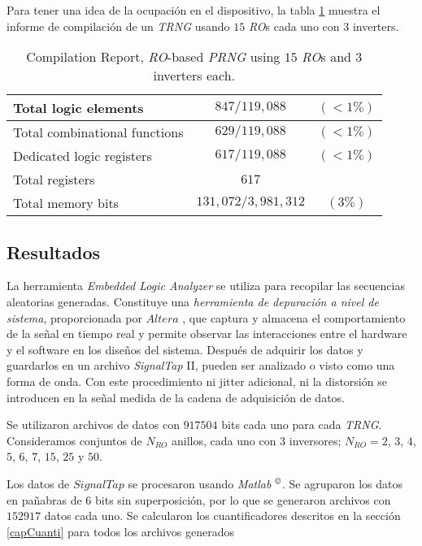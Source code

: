 Para tener una idea de la ocupación en el dispositivo, la tabla \ref{table:compilation} muestra el informe de compilación de un \emph{TRNG} usando $15$ \emph{RO}s cada uno con $3$ inverters.
\begin{table}
\begin{center}
\begin{tabular}{| l | c  c | }
	\hline
	\footnotesize{Total logic elements}          & $847/119,088$       & $( < 1 \%)$  \\ \hline
	\footnotesize{Total combinational functions} & $629/119,088$       & $( < 1 \%)$  \\ \hline
	\footnotesize{Dedicated logic registers}     & $617/119,088$       & $( < 1 \%)$  \\ \hline
	\footnotesize{Total registers}               & $617$               &  \\ \hline
	\footnotesize{Total memory bits}             & $131,072/3,981,312$ & $( 3 \%)$    \\ \hline
\end{tabular}
\end{center}
\caption{Compilation Report, \emph{RO}-based \emph{PRNG} using $15$ \emph{RO}s and $3$ inverters each.}
\label{table:compilation}
\end{table}

\subsection{Resultados}
\label{sec:results}

La herramienta \emph{Embedded Logic Analyzer} se utiliza para recopilar las secuencias aleatorias generadas.
Constituye una \emph{herramienta de depuración a nivel de sistema}, proporcionada por $ Altera $ \cite{QUARTUS}, que captura y almacena el comportamiento de la señal en tiempo real y permite observar las interacciones entre el hardware y el software en los diseños del sistema.
Después de adquirir los datos y guardarlos en un archivo \emph{SignalTap} II, pueden ser analizado o visto como una forma de onda.
Con este procedimiento ni jitter adicional, ni la distorsión se introducen en la señal medida de la cadena de adquisición de datos.

Se utilizaron archivos de datos con $917504$ bits cada uno para cada \emph{TRNG}.
Consideramos conjuntos de $N_ {RO}$ anillos, cada uno con $3$ inversores; $N_{RO}=2$, $3$, $4$, $5$, $6$, $7$, $15$, $25$ y $50$.

Los datos de $SignalTap$ se procesaron usando \emph{Matlab} $^\copyright$.
Se agruparon los datos en pañabras de $6$ bits sin superposición, por lo que se generaron archivos con $152917$ datos cada uno.
Se calcularon los cuantificadores descritos en la sección \ref{capCuanti} para todos los archivos generados

